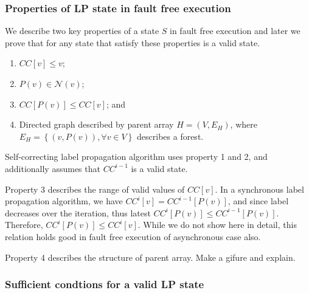 \subsubsection{Properties of LP state in fault free execution}

We describe two key properties of a state $S$ in fault free execution
and later we prove that for any state that satisfy these properties
is a valid state. 
\begin{enumerate}
\item $CC[v]\leq v$;
\item $P(v)\in\mathcal{N}(v)$;
\item $CC[P(v)]\leq CC[v]$; and 
\item Directed graph described by parent array $H=(V,E_{H})$, where $E_{H}=\left\{ (v,P(v)),\forall v\in V\right\} $
describes a forest. 
\end{enumerate}
Self-correcting label propagation algorithm uses property 1 and 2,
and additionally assumes that $CC^{i-1}$ is a valid state. 

Property 3 describes the range of valid values of $CC[v]$. In a synchronous
label propagation algorithm, we have $CC^{i}[v]=CC^{i-1}[P(v)]$,
and since label decreases over the iteration, thus latest $CC^{i}[P(v)]\leq CC^{i-1}[P(v)]$.
Therefore, $CC^{i}[P(v)]\leq CC^{i}[v]$. While we do not show here
in detail, this relation holds good in fault free execution of asynchronous
case also. 

Property 4 describes the structure of parent array. Make a gifure
and explain. 

\subsubsection{Sufficient condtions for a valid LP state }

